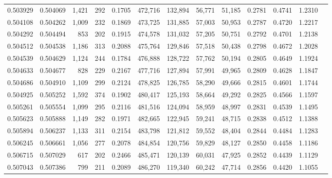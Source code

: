 \begin{tabular}{rrrrrrrrrrrrr}
0.503929 & 0.504069 & 1,421 &   292 &                                     0.1705 & 472,716 & 132,894 &  56,771 &  51,185 & 0.2781 & 0.4741 & 1.2310 \\
0.504108 & 0.504262 & 1,009 &   232 &                                     0.1869 & 473,725 & 131,885 &  57,003 &  50,953 & 0.2787 & 0.4720 & 1.2217 \\
0.504292 & 0.504494 &   853 &   202 &                                     0.1915 & 474,578 & 131,032 &  57,205 &  50,751 & 0.2792 & 0.4701 & 1.2138 \\
0.504512 & 0.504538 & 1,186 &   313 &                                     0.2088 & 475,764 & 129,846 &  57,518 &  50,438 & 0.2798 & 0.4672 & 1.2028 \\
0.504539 & 0.504629 & 1,124 &   244 &                                     0.1784 & 476,888 & 128,722 &  57,762 &  50,194 & 0.2805 & 0.4649 & 1.1924 \\
0.504633 & 0.504677 &   828 &   229 &                                     0.2167 & 477,716 & 127,894 &  57,991 &  49,965 & 0.2809 & 0.4628 & 1.1847 \\
0.504686 & 0.504910 & 1,109 &   299 &                                     0.2124 & 478,825 & 126,785 &  58,290 &  49,666 & 0.2815 & 0.4601 & 1.1744 \\
0.504925 & 0.505252 & 1,592 &   374 &                                     0.1902 & 480,417 & 125,193 &  58,664 &  49,292 & 0.2825 & 0.4566 & 1.1597 \\
0.505261 & 0.505554 & 1,099 &   295 &                                     0.2116 & 481,516 & 124,094 &  58,959 &  48,997 & 0.2831 & 0.4539 & 1.1495 \\
0.505623 & 0.505888 & 1,149 &   282 &                                     0.1971 & 482,665 & 122,945 &  59,241 &  48,715 & 0.2838 & 0.4512 & 1.1388 \\
0.505894 & 0.506237 & 1,133 &   311 &                                     0.2154 & 483,798 & 121,812 &  59,552 &  48,404 & 0.2844 & 0.4484 & 1.1283 \\
0.506245 & 0.506661 & 1,056 &   277 &                                     0.2078 & 484,854 & 120,756 &  59,829 &  48,127 & 0.2850 & 0.4458 & 1.1186 \\
0.506715 & 0.507029 &   617 &   202 &                                     0.2466 & 485,471 & 120,139 &  60,031 &  47,925 & 0.2852 & 0.4439 & 1.1129 \\
0.507043 & 0.507386 &   799 &   211 &                                     0.2089 & 486,270 & 119,340 &  60,242 &  47,714 & 0.2856 & 0.4420 & 1.1055 \\

\end{tabular}
